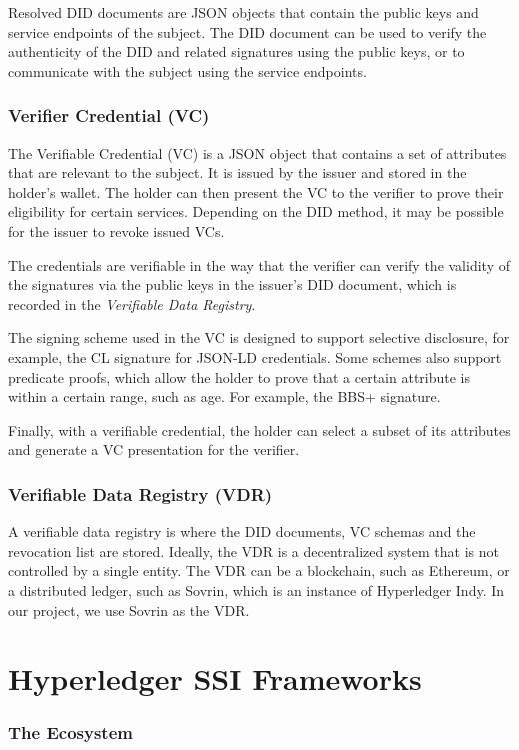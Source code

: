 \documentclass[
]{report}
\begin{document}
Resolved DID documents are JSON objects that contain the public keys and service
endpoints of the subject. The DID document can be used to verify the authenticity
of the DID and related signatures using the public keys, or to communicate with
the subject using the service endpoints.
\subsubsection{Verifier Credential (VC)}
The Verifiable Credential (VC) is a JSON object that contains a set of attributes
that are relevant to the subject. It is issued by the issuer and stored in the
holder's wallet. The holder can then present the VC to the verifier to prove
their eligibility for certain services. Depending on the DID method, it may be
possible for the issuer to revoke issued VCs.

The credentials are verifiable in the way that the verifier can verify the
validity of the signatures via the public keys in the issuer's DID document,
which is recorded in the \emph{Verifiable Data Registry}.

The signing scheme used in the VC is designed to support selective disclosure,
for example, the CL signature for JSON-LD credentials. Some schemes also 
support predicate proofs, which allow the holder to prove that a certain
attribute is within a certain range, such as age. For example, the BBS+ 
signature.

Finally, with a verifiable credential, the holder can select a subset of its
attributes and generate a VC presentation for the verifier.

\subsubsection{Verifiable Data Registry (VDR)}
A verifiable data registry is where the DID documents, VC schemas and the
revocation list are stored. Ideally, the VDR is a decentralized system that
is not controlled by a single entity. The VDR can be a blockchain, such as
Ethereum, or a distributed ledger, such as Sovrin, which is an instance of
Hyperledger Indy. In our project, we use Sovrin as the VDR.

\section{Hyperledger SSI Frameworks}

\subsubsection{The Ecosystem}
\end{document}
